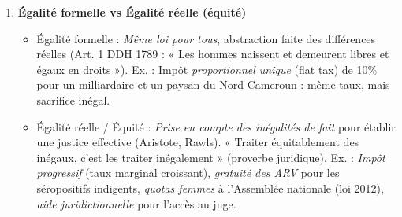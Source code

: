 \documentclass[11pt]{article}
\newcommand{\cle}[1]{{\popxbold\color{popdark}#1}}
\newcounter{popsec}
\newcounter{popsub}
\newcommand{\courssub}[1]{%
  \stepcounter{popsub}%
  \par\vspace{9pt}\noindent{\popxbold\fontsize{11.5}{13}\selectfont\color{popink}{\color{poporange}\thepopsec.\thepopsub}\hspace{6pt}#1}\par\nopagebreak\vspace{4pt}
}
\begin{document}
\begin{corrige}
\begin{enumerate}
\begin{itemize}
        \item \cle{Justice répressive} : Rapport \emph{État / délinquant} (public). But : \emph{sanctionner la faute}, protéger l'ordre public, prévenir la récidive. Sanction = \emph{peine} (prison, amende pénale, TIG), proportionnée à la gravité (proportionnalité). Ex. : Un voleur à l'arraché condamné à 2 ans de prison ferme par le Tribunal de Grande Instance de Yaoundé (Code pénal).
    \end{itemize}
    \item \textbf{Égalité formelle vs Égalité réelle (équité)}
    \begin{itemize}
        \item \cle{Égalité formelle} : \emph{Même loi pour tous}, abstraction faite des différences réelles (Art. 1 DDH 1789 : « Les hommes naissent et demeurent libres et égaux en droits »). Ex. : Impôt \emph{proportionnel unique} (flat tax) de 10\% pour un milliardaire et un paysan du Nord-Cameroun : même taux, mais sacrifice inégal.
        \item \cle{Égalité réelle / Équité} : \emph{Prise en compte des inégalités de fait} pour établir une justice effective (Aristote, Rawls). « Traiter équitablement des inégaux, c'est les traiter inégalement » (proverbe juridique). Ex. : \emph{Impôt progressif} (taux marginal croissant), \emph{gratuité des ARV} pour les séropositifs indigents, \emph{quotas femmes} à l'Assemblée nationale (loi 2012), \emph{aide juridictionnelle} pour l'accès au juge.
    \end{itemize}
\end{enumerate}
\end{corrige}

\courssub{Je m'entraîne}
\end{document}
